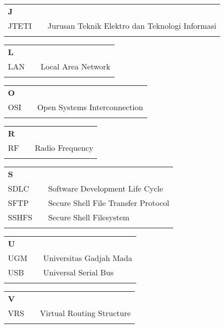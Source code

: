 \documentclass{mipathesis}
\begin{document}
\begin{tabular}{p{20pt}p{3pt}l}
\textbf{J}\\
JTETI & & Jurusan Teknik Elektro dan Teknologi Informasi\\
\\
\end{tabular}

\begin{tabular}{p{20pt}p{3pt}l}
\textbf{L}\\
LAN & & Local Area Network\\
\\
\end{tabular}

\begin{tabular}{p{20pt}p{3pt}l}
\textbf{O}\\
OSI & & Open Systems Interconnection\\
\\
\end{tabular}

\begin{tabular}{p{20pt}p{3pt}l}
\textbf{R}\\
RF & & Radio Frequency\\
\\
\end{tabular}

\begin{tabular}{p{20pt}p{3pt}l}
\textbf{S}\\
SDLC & & Software Development Life Cycle\\
SFTP & & Secure Shell File Transfer Protocol\\
SSHFS & & Secure Shell Filesystem\\
\\
\end{tabular}

\begin{tabular}{p{20pt}p{3pt}l}
\textbf{U}\\
UGM & & Universitas Gadjah Mada\\
USB & & Universal Serial Bus\\
\\
\end{tabular}

\begin{tabular}{p{20pt}p{3pt}l}
\textbf{V}\\
VRS & & Virtual Routing Structure\\
\\
\end{tabular}
\end{document}
